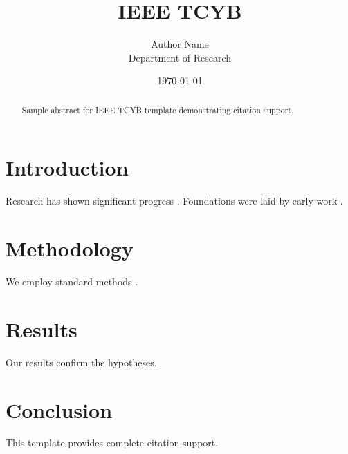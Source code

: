 ﻿\documentclass{IEEEtran}
\title{IEEE TCYB}
\author{Author Name \\ \small Department of Research}
\date{\today}
\begin{document}
\maketitle

\begin{abstract}
Sample abstract for IEEE TCYB template demonstrating citation support.
\end{abstract}

\section{Introduction}
Research has shown significant progress \citep{einstein1905}. Foundations were laid by early work \citep{turing1950}.

\section{Methodology}
We employ standard methods \citep{knuth1984}.

\section{Results}
Our results confirm the hypotheses.

\section{Conclusion}
This template provides complete citation support.



\end{document}
